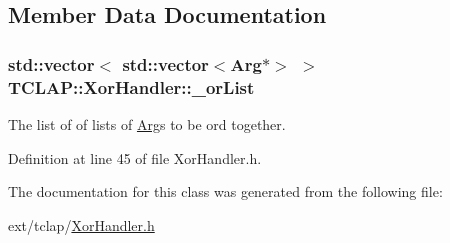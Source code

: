 \subsection{Member Data Documentation}
\hypertarget{class_t_c_l_a_p_1_1_xor_handler_a4ebd5b96e23a0ab03bdd431fe622d4e1}{}
\subsubsection[{\+\_\+or\+List}]{\setlength{\rightskip}{0pt plus 5cm}std\+::vector$<$ std\+::vector$<${\bf Arg}$\ast$$>$ $>$ T\+C\+L\+A\+P\+::\+Xor\+Handler\+::\+\_\+or\+List\hspace{0.3cm}{\ttfamily [protected]}}\label{class_t_c_l_a_p_1_1_xor_handler_a4ebd5b96e23a0ab03bdd431fe622d4e1}
The list of of lists of \hyperlink{class_t_c_l_a_p_1_1_arg}{Arg}\textquotesingle{}s to be or\textquotesingle{}d together. 

Definition at line 45 of file Xor\+Handler.\+h.



The documentation for this class was generated from the following file\+:\begin{DoxyCompactItemize}
\item 
ext/tclap/\hyperlink{_xor_handler_8h}{Xor\+Handler.\+h}\end{DoxyCompactItemize}
